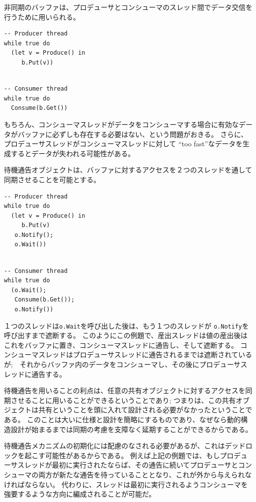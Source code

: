 \documentclass[\pformat,12pt]{jreport}
\begin{document}
非同期のバッファは、プロデューサとコンシューマのスレッド間でデータ交信を行うために用いられる。

\begin{multicols}{2}
\begin{lstlisting}
-- Producer thread
while true do
  (let v = Produce() in
     b.Put(v))
\end{lstlisting}
\begin{lstlisting}

-- Consumer thread
while true do
  Consume(b.Get())
\end{lstlisting}
\end{multicols}

もちろん、コンシューマスレッドがデータをコンシューマする場合に有効なデータがバッファに必ずしも存在する必要はない、という問題がおきる。
さらに、プロデューサスレッドがコンシューマスレッドに対して ``too fast''なデータを生成するとデータが失われる可能性がある。

待機通告オブジェクトは、バッファに対するアクセスを２つのスレッドを通して同期させることを可能とする。

\begin{multicols}{2}
\begin{lstlisting}
-- Producer thread
while true do
  (let v = Produce() in
     b.Put(v)
   o.Notify();
   o.Wait())
\end{lstlisting}
\begin{lstlisting}

-- Consumer thread
while true do
  (o.Wait();
   Consume(b.Get());
   o.Notify())
\end{lstlisting}
\end{multicols}

１つのスレッドは\texttt{o.Wait}を呼び出した後は、もう１つのスレッドが \texttt{o.Notify}を呼び出すまで遮断する。
このようにこの例題で、産出スレッドは値の産出後はこれをバッファに置き、コンシューマスレッドに通告し、そして遮断する。
コンシューマスレッドはプロデューサスレッドに通告されるまでは遮断されているが;　それからバッファ内のデータをコンシューマし、その後にプロデューサスレッドに通告する。

待機通告を用いることの利点は、任意の共有オブジェクトに対するアクセスを同期させることに用いることができるということであり; つまりは、この共有オブジェクトは共有ということを頭に入れて設計される必要がなかったということである。
このことは大いに仕様と設計を簡略にするものであり、なぜなら動的構造設計が始まるまでは同期の考慮を支障なく延期することができるからである。

待機通告メカニズムの初期化には配慮のなされる必要があるが、これはデッドロックを起こす可能性があるからである。
例えば上記の例題では、もしプロデューサスレッドが最初に実行されたならば、その通告に続いてプロデューサとコンシューマの両方が新たな通告を待っていることとなり、これが外から与えられなければならない。
代わりに、スレッドは最初に実行されるようコンシューマを強要するような方向に編成されることが可能だ。
\end{document}
